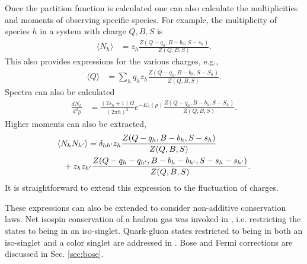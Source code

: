 Once the partition function is calculated one can also calculate the multiplicities and moments of observing specific species. For example, the multiplicity of species $h$ in a system with charge $Q,B,S$ is
\begin{eqnarray}
\langle N_h\rangle &= z_h\frac{Z(Q-q_h,B-b_h,S-s_h)}{Z(Q,B,S)}.
\end{eqnarray}
This also provides expressions for the various charges, e.g.,
\begin{eqnarray}
\langle Q\rangle &= \sum_h q_hz_h\frac{Z(Q-q_h,B-b_h,S-S_h)}{Z(Q,B,S)}.
\end{eqnarray}
Spectra can also be calculated
\begin{eqnarray}
\frac{dN_h}{d^3p}&=\frac{(2s_h+1)\Omega}{(2\pi\hbar)^3}e^{-E_h(p)}\frac{Z(Q-q_h,B-b_h,S-S_h)}{Z(Q,B,S)}.
\end{eqnarray}
Higher moments can also be extracted,
\begin{eqnarray}
\langle N_hN_{h'}\rangle &= \delta_{hh'}z_h\frac{Z(Q-q_h,B-b_h,S-s_h)}{Z(Q,B,S)}\\
&\hspace*{-30pt}+z_hz_{h'}\frac{Z(Q-q_h-q_{h'},B-b_h-b_{h'},S-s_h-s_{h'})}{Z(Q,B,S)}.
\end{eqnarray}
It is straightforward to extend this expression to the fluctuation of charges.

These expressions can also be extended to consider non-additive conservation laws. Net isospin conservation of a hadron gas was invoked in \cite{Cheng:2002jb}, i.e. restricting the states to being in an iso-singlet.  Quark-gluon states restricted to being in both an iso-singlet and a color singlet are addressed in \cite{Pratt:2003jd}. Bose and Fermi corrections are discussed in Sec. \ref{sec:bose}.

